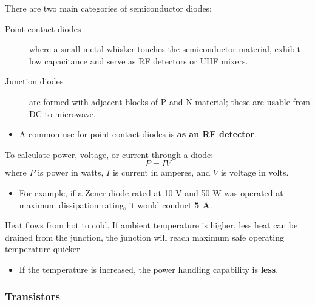 \documentclass[letterpaper]{article}
\begin{document}
        There are two main categories of semiconductor diodes:
        \begin{description}
            \item[Point-contact diodes] where a small metal whisker touches the semiconductor material, exhibit low capacitance and serve as RF detectors or UHF mixers.
            \item[Junction diodes] are formed with adjacent blocks of P and N material; these are usable from DC to microwave.
        \end{description}
        \begin{itemize}
            \item A common use for point contact diodes is \textbf{as an RF detector}.
        \end{itemize}

        To calculate power, voltage, or current through a diode:
        $$ P = I V $$
        where $ P $ is power in watts, $ I $ is current in amperes, and $ V $ is voltage in volts.
        \begin{itemize}
            \item For example, if a Zener diode rated at 10 V and 50 W was operated at maximum dissipation rating, it would conduct \textbf{5 A}.
        \end{itemize}

        Heat flows from hot to cold.
        If ambient temperature is higher, less heat can be drained from the junction, the junction will reach maximum safe operating temperature quicker.
        \begin{itemize}
            \item If the temperature is increased, the power handling capability is \textbf{less}.
        \end{itemize}

        \subsubsection{Transistors}
\end{document}
